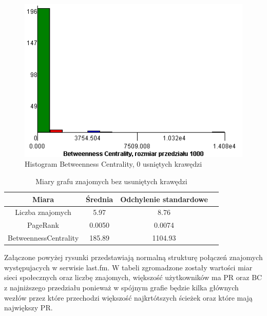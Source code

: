 \documentclass[10pt,a4paper]{article}
\begin{document}
\begin{figure}[H]
\centering
\caption{Histogram Betweenness Centrality, 0 usniętych krawędzi}
\includegraphics[scale=0.6]{wyniki/final200Friends/0200friendsBCHist.png}
\end{figure}


\begin{table}[H]
  \caption{Miary grafu znajomych bez usuniętych krawędzi}
  \centering
    \begin{tabular}{cccc}
    \addlinespace
    \toprule
    Miara & Średnia  & Odchylenie standardowe \\
    \midrule
    Liczba znajomych & 5.97 & 8.76 \\
    PageRank & 0.0050 & 0.0074 \\
    BetweennessCentrality & 185.89 & 1104.93\\ 
    \bottomrule
    \end{tabular}
  \label{tab:addlabel}
\end{table}

Załączone powyżej rysunki przedstawiają normalną strukturę połączeń znajomych występujacych w serwisie last.fm. W tabeli zgromadzone zostały wartości miar sieci społecznych oraz liczbę znajomych, większość użytkowników ma PR oraz BC z najniższego przedziału ponieważ w spójnym grafie będzie kilka głównych wezłów przez które przechodzi większość najkrtótszych ścieżek oraz które mają największy PR.
\end{document}
